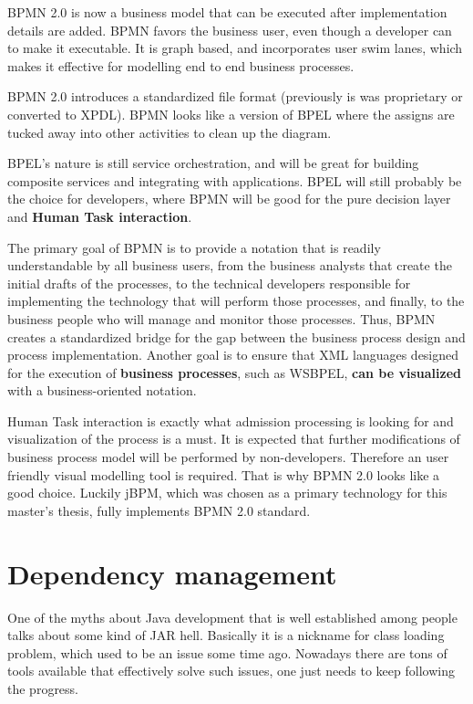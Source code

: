 	\cite{ms_bpmn_bpel}
	BPMN 2.0 is now a business model that can be executed after implementation details are added. BPMN favors the business
	user, even though a developer can  to make it executable. It is graph based, and
	incorporates user swim lanes, which makes it effective for modelling end to end business processes. 
	
	BPMN 2.0 introduces a standardized file format (previously is was proprietary or converted to XPDL). BPMN looks like a
	version of BPEL where the assigns are tucked away into other activities to clean up the diagram.

	BPEL's nature is still service orchestration, and will be great for building composite services and
	integrating with applications. BPEL will still probably be the choice for developers, where BPMN will be good for the
	pure decision layer and \textbf{Human Task interaction}.
	
	\cite[p.~1]{bpmn}
	The primary goal of BPMN is to provide a notation that is readily understandable by all business users, from the
	business analysts that create the initial drafts of the processes, to the technical developers responsible for
	implementing the technology that will perform those processes, and finally, to the business people who will manage and
	monitor those processes. Thus, BPMN creates a standardized bridge for the gap between the business process design and
	process implementation.
	Another goal  is to ensure that XML languages designed for the execution of \textbf{business processes}, such as
	\gls{WSBPEL}, \textbf{can be visualized} with a business-oriented notation.
	
	Human Task interaction is exactly what admission processing is looking for and visualization of the process is a must.
	It is expected that further modifications of business process model will be performed by non-developers. Therefore an
	user friendly visual modelling tool is required. That is why BPMN 2.0 looks like a good choice. Luckily jBPM, which was
	chosen as a primary technology for this master's thesis, fully implements BPMN 2.0 standard.
	
	\section{Dependency management}
	
	One of the myths about Java development that is well established among people talks about some kind of JAR hell.
	Basically it is a nickname for class loading problem, which used to be an issue some time ago. Nowadays there are tons
	of tools available that effectively solve such issues, one just needs to keep following the progress.
	
